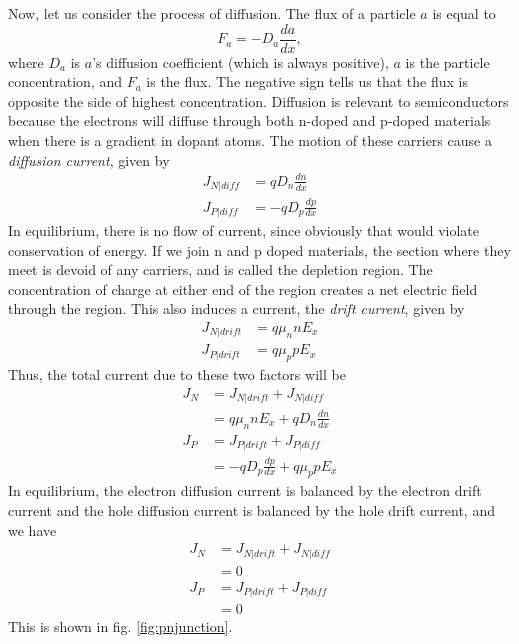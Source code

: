 \documentclass[nobib]{tufte-handout}
\begin{document}
Now, let us consider the process of diffusion. The flux of 
a particle $a$ is equal to 
\[F_a = -D_a \frac{da}{dx},\]
where $D_a$ is $a$'s diffusion coefficient (which 
is always positive), $a$ is the particle concentration, and $F_a$ is the flux. 
The negative sign tells us that the flux is opposite the 
side of highest concentration. Diffusion is relevant to semiconductors 
because the electrons will diffuse through both n-doped and 
p-doped materials when there is a gradient in dopant atoms. 
The motion of these carriers cause a \emph{diffusion current},
given by 
\begin{align*}
    J_{N|diff} &= qD_n \frac{dn}{dx} \\
    J_{P|diff} &= -qD_p \frac{dp}{dx}
\end{align*}
In equilibrium, there is no flow of current, since obviously that 
would violate conservation of energy. If we join n and p doped 
materials, the section where they meet is devoid of any carriers,
and is called the depletion region. The concentration of charge 
at either end of the region creates a net electric field through 
the region. This also induces a current, the \emph{drift current}, 
given by 
\begin{align*}
    J_{N|drift} &= q\mu_n n E_x \\
    J_{P|drift} &= q\mu_p p E_x
\end{align*}
Thus, the total current due to these two 
factors will be 
\begin{align*}
    J_N &= J_{N|drift} + J_{N|diff} \\
    &= q\mu_n n E_x + qD_n \frac{dn}{dx} \\
    J_P &= J_{P|drift} + J_{P|diff} \\
    &= -qD_p \frac{dp}{dx} + q\mu_p p E_x
\end{align*}
In equilibrium, the electron diffusion current is 
balanced by the electron drift current and the hole diffusion
current is balanced by the hole drift current, and we have 
\begin{align*}
    J_N &= J_{N|drift} + J_{N|diff} \\
    &= 0 \\
    J_P &= J_{P|drift} + J_{P|diff} \\
    &= 0
\end{align*}
This is shown in fig. \ref{fig:pnjunction}. 
\end{document}
